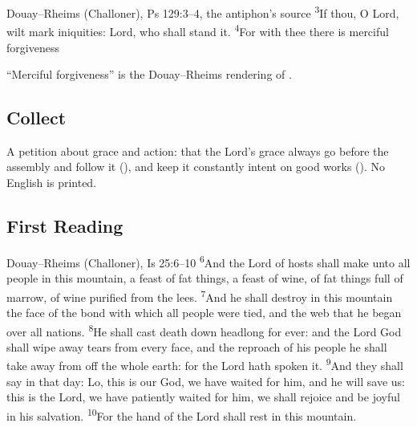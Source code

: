 \begin{englishwitness}{Douay--Rheims (Challoner), Ps 129:3--4, the antiphon's source}
\textsuperscript{3}If thou, O Lord, wilt mark iniquities: Lord, who shall stand
it. \textsuperscript{4}For with thee there is merciful forgiveness
\end{englishwitness}

\noindent ``Merciful forgiveness'' is the Douay--Rheims rendering of
.

\subsection{Collect}
\label{proper-collect}


\noindent A petition about grace and action: that the Lord's grace always go
before the assembly and follow it (),
and keep it constantly intent on good works (). No English is printed.

\subsection{First Reading}
\label{proper-first-reading}


\begin{englishwitness}{Douay--Rheims (Challoner), Is 25:6--10}
\textsuperscript{6}And the Lord of hosts shall make unto all people in this
mountain, a feast of fat things, a feast of wine, of fat things full of marrow,
of wine purified from the lees. \textsuperscript{7}And he shall destroy in this
mountain the face of the bond with which all people were tied, and the web that
he began over all nations. \textsuperscript{8}He shall cast death down headlong
for ever: and the Lord God shall wipe away tears from every face, and the
reproach of his people he shall take away from off the whole earth: for the
Lord hath spoken it. \textsuperscript{9}And they shall say in that day: Lo,
this is our God, we have waited for him, and he will save us: this is the Lord,
we have patiently waited for him, we shall rejoice and be joyful in his
salvation. \textsuperscript{10}For the hand of the Lord shall rest in this
mountain.
\end{englishwitness}

